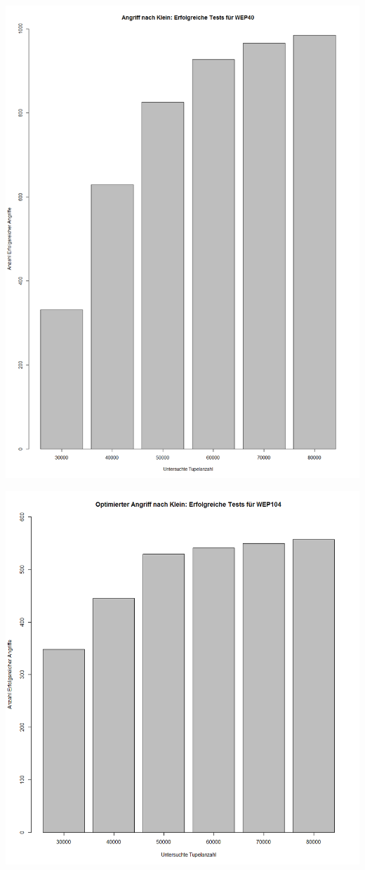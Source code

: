 \documentclass[10pt,a4paper]{article}
\begin{document}
\includegraphics[width=\textwidth]{img/wep40_erfolg.png}
\label{fig:wep40_suc}
\newpage

\includegraphics[width=\textwidth]{img/WEP_104_erfolgreich.png}
\label{fig:wep100_suc}
\newpage
\end{document}

